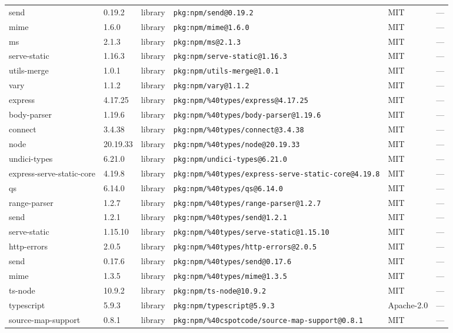 \documentclass[11pt]{article}
\begin{document}
\begin{longtable}{|l|l|l|p{2.2cm}|l|p{4cm}|}
send & 0.19.2 & library & \texttt{pkg:npm/send@0.19.2} & MIT & — \\
mime & 1.6.0 & library & \texttt{pkg:npm/mime@1.6.0} & MIT & — \\
ms & 2.1.3 & library & \texttt{pkg:npm/ms@2.1.3} & MIT & — \\
serve-static & 1.16.3 & library & \texttt{pkg:npm/serve-static@1.16.3} & MIT & — \\
utils-merge & 1.0.1 & library & \texttt{pkg:npm/utils-merge@1.0.1} & MIT & — \\
vary & 1.1.2 & library & \texttt{pkg:npm/vary@1.1.2} & MIT & — \\
express & 4.17.25 & library & \texttt{pkg:npm/\%40types/express@4.17.25} & MIT & — \\
body-parser & 1.19.6 & library & \texttt{pkg:npm/\%40types/body-parser@1.19.6} & MIT & — \\
connect & 3.4.38 & library & \texttt{pkg:npm/\%40types/connect@3.4.38} & MIT & — \\
node & 20.19.33 & library & \texttt{pkg:npm/\%40types/node@20.19.33} & MIT & — \\
undici-types & 6.21.0 & library & \texttt{pkg:npm/undici-types@6.21.0} & MIT & — \\
express-serve-static-core & 4.19.8 & library & \texttt{pkg:npm/\%40types/express-serve-static-core@4.19.8} & MIT & — \\
qs & 6.14.0 & library & \texttt{pkg:npm/\%40types/qs@6.14.0} & MIT & — \\
range-parser & 1.2.7 & library & \texttt{pkg:npm/\%40types/range-parser@1.2.7} & MIT & — \\
send & 1.2.1 & library & \texttt{pkg:npm/\%40types/send@1.2.1} & MIT & — \\
serve-static & 1.15.10 & library & \texttt{pkg:npm/\%40types/serve-static@1.15.10} & MIT & — \\
http-errors & 2.0.5 & library & \texttt{pkg:npm/\%40types/http-errors@2.0.5} & MIT & — \\
send & 0.17.6 & library & \texttt{pkg:npm/\%40types/send@0.17.6} & MIT & — \\
mime & 1.3.5 & library & \texttt{pkg:npm/\%40types/mime@1.3.5} & MIT & — \\
ts-node & 10.9.2 & library & \texttt{pkg:npm/ts-node@10.9.2} & MIT & — \\
typescript & 5.9.3 & library & \texttt{pkg:npm/typescript@5.9.3} & Apache-2.0 & — \\
source-map-support & 0.8.1 & library & \texttt{pkg:npm/\%40cspotcode/source-map-support@0.8.1} & MIT & — \\

\end{longtable}
\end{document}
